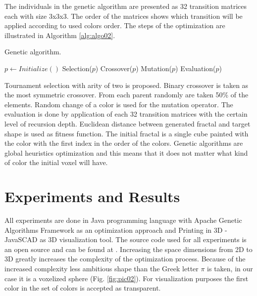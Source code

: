 \documentclass{llncs}
\begin{document}
The individuals in the genetic algorithm are presented as 32 transition matrices each with size 3x3x3. The order of the matrices shows which transition will be applied according to used colors order. The steps of the optimization are illustrated in Algorithm \ref{alg:algo02}. 

\begin{algorithm}
\caption{Genetic algorithm.}\label{alg:algo02}
\begin{algorithmic}[1]
\State $p \gets Initialize()$
  \State Selection($p$)\label{alg:step05}
  \State Crossover($p$)
  \State Mutation($p$)
  \State Evaluation($p$)
\EndWhile
\EndProcedure
\end{algorithmic}
\end{algorithm}
\FloatBarrier

Tournament selection with arity of two is proposed. Binary crossover is taken as the most symmetric crossover. From each parent randomly are taken 50\% of the elements. Random change of a color is used for the mutation operator. The evaluation is done by application of each 32 transition matrices with the certain level of recursion depth. Euclidean distance between generated fractal and target shape is used as fitness function. The initial fractal is a single cube painted with the color with the first index in the order of the colors. Genetic algorithms are global heuristics optimization and this means that it does not matter what kind of color the initial voxel will have. 

\section{Experiments and Results} \label{Experiments and Results}

All experiments are done in Java programming language with Apache Genetic Algorithms Framework \cite{apache01} as an optimization approach and Printing in 3D - JavaSCAD \cite{printing01} as 3D visualization tool. The source code used for all experiments is an open source and can be found at \cite{balabanov01}. Increasing the space dimensions from 2D to 3D greatly increases the complexity of the optimization process. Because of the increased complexity less ambitious shape than the Greek letter $\pi$ is taken, in our case it is a voxelized sphere (Fig. \ref{fig:pic02}). For visualization purposes the first color in the set of colors is accepted as transparent. 
\end{document}
